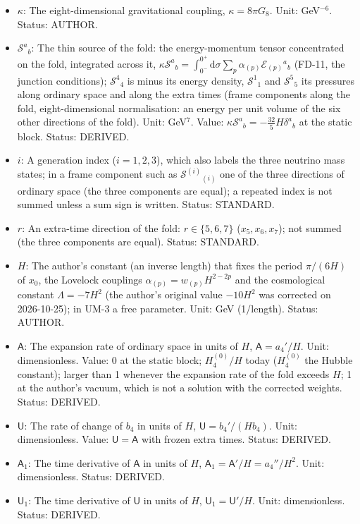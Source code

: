 \documentclass[
  10pt,
]{article}
\providecommand{\tightlist}{%
  \setlength{\itemsep}{0pt}\setlength{\parskip}{0pt}}
\begin{document}
\begin{itemize}
\tightlist
\item
  \(\kappa\): The eight-dimensional gravitational coupling,
  \(\kappa = 8\pi G_8\). Unit: GeV\(^{-6}\). Status: AUTHOR.
\item
  \(\mathcal{S}^a{}_b\): The thin source of the fold: the
  energy-momentum tensor concentrated on the fold, integrated across it,
  \(\kappa\mathcal{S}^a{}_b = \int_{0^-}^{0^+}\mathrm{d}\sigma\sum_p\alpha_{(p)}\mathcal{E}_{(p)}{}^a{}_b\)
  (FD-11, the junction conditions); \(\mathcal{S}^4{}_4\) is minus its
  energy density, \(\mathcal{S}^1{}_1\) and \(\mathcal{S}^5{}_5\) its
  pressures along ordinary space and along the extra times (frame
  components along the fold, eight-dimensional normalisation: an energy
  per unit volume of the six other directions of the fold). Unit:
  GeV\(^7\). Value:
  \(\kappa\mathcal{S}^a{}_b = -\frac{32}{5}H\delta^a{}_b\) at the static
  block. Status: DERIVED.
\item
  \(i\): A generation index (\(i = 1, 2, 3\)), which also labels the
  three neutrino mass states; in a frame component such as
  \(\mathcal{S}^{(i)}{}_{(i)}\) one of the three directions of ordinary
  space (the three components are equal); a repeated index is not summed
  unless a sum sign is written. Status: STANDARD.
\item
  \(r\): An extra-time direction of the fold: \(r \in \{5, 6, 7\}\)
  (\(x_5, x_6, x_7\)); not summed (the three components are equal).
  Status: STANDARD.
\item
  \(H\): The author's constant (an inverse length) that fixes the period
  \(\pi/(6H)\) of \(x_0\), the Lovelock couplings
  \(\alpha_{(p)} = w_{(p)}H^{2-2p}\) and the cosmological constant
  \(\Lambda = -7H^2\) (the author's original value \(-10H^2\) was
  corrected on 2026-10-25); in UM-3 a free parameter. Unit: GeV
  (1/length). Status: AUTHOR.
\item
  \(\mathsf{A}\): The expansion rate of ordinary space in units of
  \(H\), \(\mathsf{A} = a_4'/H\). Unit: dimensionless. Value: 0 at the
  static block; \(H_4^{(0)}/H\) today (\(H_4^{(0)}\) the Hubble
  constant); larger than 1 whenever the expansion rate of the fold
  exceeds \(H\); 1 at the author's vacuum, which is not a solution with
  the corrected weights. Status: DERIVED.
\item
  \(\mathsf{U}\): The rate of change of \(b_4\) in units of \(H\),
  \(\mathsf{U} = b_4'/(Hb_4)\). Unit: dimensionless. Value:
  \(\mathsf{U} = \mathsf{A}\) with frozen extra times. Status: DERIVED.
\item
  \(\mathsf{A}_1\): The time derivative of \(\mathsf{A}\) in units of
  \(H\), \(\mathsf{A}_1 = \mathsf{A}'/H = a_4''/H^2\). Unit:
  dimensionless. Status: DERIVED.
\item
  \(\mathsf{U}_1\): The time derivative of \(\mathsf{U}\) in units of
  \(H\), \(\mathsf{U}_1 = \mathsf{U}'/H\). Unit: dimensionless. Status:
  DERIVED.
\end{itemize}
\end{document}
